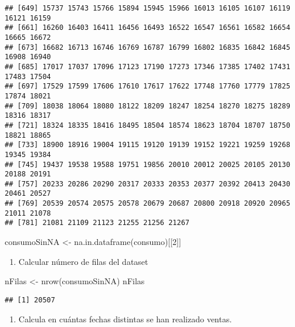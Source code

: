 \documentclass[
]{book}
\newenvironment{Shaded}{\begin{snugshade}}{\end{snugshade}}
\newcommand{\DecValTok}[1]{\textcolor[rgb]{0.00,0.00,0.81}{#1}}
\newcommand{\FunctionTok}[1]{\textcolor[rgb]{0.00,0.00,0.00}{#1}}
\newcommand{\NormalTok}[1]{#1}
\newcommand{\OtherTok}[1]{\textcolor[rgb]{0.56,0.35,0.01}{#1}}
\providecommand{\tightlist}{%
  \setlength{\itemsep}{0pt}\setlength{\parskip}{0pt}}
\begin{document}
\begin{verbatim}
## [649] 15737 15743 15766 15894 15945 15966 16013 16105 16107 16119 16121 16159
## [661] 16260 16403 16411 16456 16493 16522 16547 16561 16582 16654 16665 16672
## [673] 16682 16713 16746 16769 16787 16799 16802 16835 16842 16845 16908 16940
## [685] 17017 17037 17096 17123 17190 17273 17346 17385 17402 17431 17483 17504
## [697] 17529 17599 17606 17610 17617 17622 17748 17760 17779 17825 17874 18021
## [709] 18038 18064 18080 18122 18209 18247 18254 18270 18275 18289 18316 18317
## [721] 18324 18335 18416 18495 18504 18574 18623 18704 18707 18750 18821 18865
## [733] 18900 18916 19004 19115 19120 19139 19152 19221 19259 19268 19345 19384
## [745] 19437 19538 19588 19751 19856 20010 20012 20025 20105 20130 20188 20191
## [757] 20233 20286 20290 20317 20333 20353 20377 20392 20413 20430 20461 20527
## [769] 20539 20574 20575 20578 20679 20687 20800 20918 20920 20965 21011 21078
## [781] 21081 21109 21123 21255 21256 21267
\end{verbatim}

\begin{Shaded}
\begin{Highlighting}[]
\NormalTok{consumoSinNA }\OtherTok{\textless{}{-}} \FunctionTok{na.in.dataframe}\NormalTok{(consumo)[[}\DecValTok{2}\NormalTok{]]}
\end{Highlighting}
\end{Shaded}

\begin{enumerate}
\def\labelenumi{\arabic{enumi}.}
\setcounter{enumi}{7}
\tightlist
\item
  Calcular número de filas del dataset
\end{enumerate}

\begin{Shaded}
\begin{Highlighting}[]
\NormalTok{nFilas }\OtherTok{\textless{}{-}} \FunctionTok{nrow}\NormalTok{(consumoSinNA)}
\NormalTok{nFilas}
\end{Highlighting}
\end{Shaded}

\begin{verbatim}
## [1] 20507
\end{verbatim}

\begin{enumerate}
\def\labelenumi{\arabic{enumi}.}
\setcounter{enumi}{8}
\tightlist
\item
  Calcula en cuántas fechas distintas se han realizado ventas.
\end{enumerate}
\end{document}
